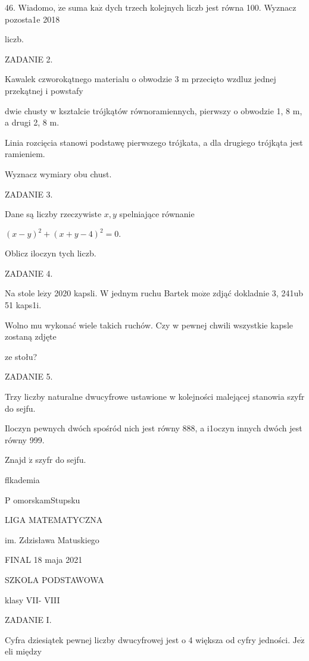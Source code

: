 \documentclass[a4paper,12pt]{article}
\begin{document}
46. Wiadomo, $\dot{\mathrm{z}}\mathrm{e}$ suma $\mathrm{k}\mathrm{a}\dot{\mathrm{z}}$ dych trzech kolejnych liczb jest równa 100. Wyznacz pozosta1e 2018

liczb.

ZADANIE 2.

Kawalek czworokątnego materialu o obwodzie 3 $\mathrm{m}$ przecięto wzdluz jednej przekątnej i powstafy

dwie chusty w ksztalcie trójkątów równoramiennych, pierwszy o obwodzie 1, 8 $\mathrm{m}$, a drugi 2, 8 $\mathrm{m}.$

Linia rozcięcia stanowi podstawę pierwszego trójkata, a dla drugiego trójkąta jest ramieniem.

Wyznacz wymiary obu chust.

ZADANIE 3.

Dane są liczby rzeczywiste $x, y$ spelniające równanie

$(x-y)^{2}+(x+y-4)^{2}=0.$

Oblicz iloczyn tych liczb.

ZADANIE 4.

Na stole $\mathrm{l}\mathrm{e}\dot{\mathrm{z}}\mathrm{y}$ 2020 kapsli. $\mathrm{W}$ jednym ruchu Bartek $\mathrm{m}\mathrm{o}\dot{\mathrm{z}}\mathrm{e}$ zdjąć dokladnie 3, 241ub 51 kaps1i.

Wolno mu wykonać wiele takich ruchów. Czy w pewnej chwili wszystkie kapsle zostaną zdjęte

ze stołu?

ZADANIE 5.

Trzy liczby naturalne dwucyfrowe ustawione w kolejności malejącej stanowia szyfr do sejfu.

Iloczyn pewnych dwóch spośród nich jest równy 888, a i1oczyn innych dwóch jest równy 999.

Znajd $\acute{\mathrm{z}}$ szyfr do sejfu.






flkademia

P omorskamStupsku

LIGA MATEMATYCZNA

im. Zdzisława Matuskiego

FINAL 18 maja 2021

SZKOLA PODSTAWOWA

klasy VII- VIII

ZADANIE I.

Cyfra dziesiątek pewnej liczby dwucyfrowej jest o 4 większa od cyfry jedności. $\mathrm{J}\mathrm{e}\dot{\mathrm{z}}$ eli między
\end{document}
